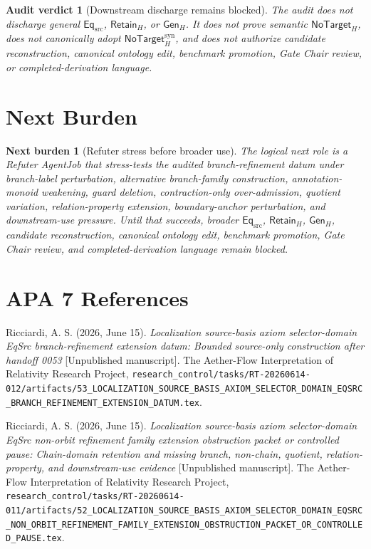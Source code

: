 \documentclass[11pt]{article}
\newcommand{\EqSrc}{\mathsf{Eq}_{\mathrm{src}}}
\newcommand{\RetainH}{\mathsf{Retain}_{H}}
\newcommand{\GenH}{\mathsf{Gen}_{H}}
\newcommand{\NoTargetH}{\mathsf{NoTarget}_{H}}
\newcommand{\NoTargetSyn}{\mathsf{NoTarget}_{H}^{\mathrm{syn}}}
\newtheorem{auditverdict}{Audit verdict}
\newtheorem{nextburden}{Next burden}
\begin{document}
\begin{auditverdict}[Downstream discharge remains blocked]
The audit does not discharge general \(\EqSrc\), \(\RetainH\), or
\(\GenH\). It does not prove semantic \(\NoTargetH\), does not
canonically adopt \(\NoTargetSyn\), and does not authorize candidate
reconstruction, canonical ontology edit, benchmark promotion, Gate Chair
review, or completed-derivation language.
\end{auditverdict}

\section{Next Burden}

\begin{nextburden}[Refuter stress before broader use]
The logical next role is a Refuter AgentJob that stress-tests the
audited branch-refinement datum under branch-label perturbation,
alternative branch-family construction, annotation-monoid weakening,
guard deletion, contraction-only over-admission, quotient variation,
relation-property extension, boundary-anchor perturbation, and
downstream-use pressure. Until that succeeds, broader \(\EqSrc\),
\(\RetainH\), \(\GenH\), candidate reconstruction, canonical ontology
edit, benchmark promotion, Gate Chair review, and completed-derivation
language remain blocked.
\end{nextburden}

\section*{APA 7 References}

Ricciardi, A. S. (2026, June 15). \emph{Localization source-basis axiom
selector-domain EqSrc branch-refinement extension datum: Bounded
source-only construction after handoff 0053} [Unpublished manuscript].
The Aether-Flow Interpretation of Relativity Research Project,
\texttt{research\_control/tasks/RT-20260614-012/artifacts/53\_LOCALIZATION\_SOURCE\_BASIS\_AXIOM\_SELECTOR\_DOMAIN\_EQSRC\_BRANCH\_REFINEMENT\_EXTENSION\_DATUM.tex}.

Ricciardi, A. S. (2026, June 15). \emph{Localization source-basis axiom
selector-domain EqSrc non-orbit refinement family extension obstruction
packet or controlled pause: Chain-domain retention and missing branch,
non-chain, quotient, relation-property, and downstream-use evidence}
[Unpublished manuscript]. The Aether-Flow Interpretation of Relativity
Research Project,
\texttt{research\_control/tasks/RT-20260614-011/artifacts/52\_LOCALIZATION\_SOURCE\_BASIS\_AXIOM\_SELECTOR\_DOMAIN\_EQSRC\_NON\_ORBIT\_REFINEMENT\_FAMILY\_EXTENSION\_OBSTRUCTION\_PACKET\_OR\_CONTROLLED\_PAUSE.tex}.
\end{document}

